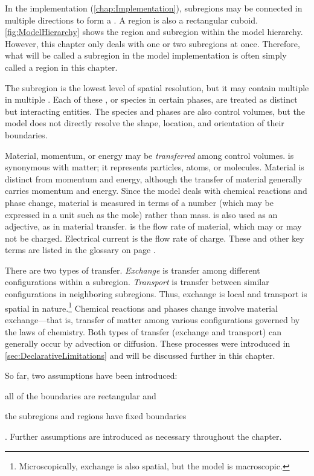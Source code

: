 In the implementation (\autoref{chap:Implementation}), subregions may be connected in multiple directions to form a \emph{}.  A region is also a rectangular cuboid.  \autoref{fig:ModelHierarchy} shows the region and subregion within the model hierarchy.  However, this chapter only deals with one or two subregions at once.  Therefore, what will be called a subregion in the model implementation is often simply called a region in this chapter.

The subregion is the lowest level of spatial resolution, but it may contain multiple \emph{} in multiple \emph{}.  Each of these \emph{}, or species in certain phases, are treated as distinct but interacting entities.  The species and phases are also control volumes, but the model does not directly resolve the shape, location, and orientation of their boundaries.

Material, momentum, or energy may be \emph{transferred} among control volumes.  \emph{} is synonymous with matter; it represents particles, atoms, or molecules.  Material is distinct from momentum and energy, although the transfer of material generally carries momentum and energy.  Since the model deals with chemical reactions and phase change, material is measured in terms of a number (which may be expressed in a unit such as the mole) rather than mass.   is also used as an adjective, as in material transfer.  \emph{} is the flow rate of material, which may or may not be charged.  Electrical current is the flow rate of charge.  These and other key terms are listed in the glossary on page \pageref{mark:Glossary}.

There are two types of transfer.  \emph{Exchange} is transfer among different configurations within a subregion.  \emph{Transport} is transfer between similar configurations in neighboring subregions.  Thus, exchange is local and transport is spatial in nature.\footnote{Microscopically, exchange is also spatial, but the model is macroscopic.}  Chemical reactions and phases change involve material exchange---that is, transfer of matter among various configurations governed by the laws of chemistry.  Both types of transfer (exchange and transport) can generally occur by advection or diffusion.  These processes were introduced in \autoref{sec:DeclarativeLimitations} and will be discussed further in this chapter.

So far, two assumptions have been introduced: \begin{inparaenum}[(1)]\item all of the boundaries are rectangular and \item the subregions and regions have fixed boundaries\end{inparaenum}.  Further assumptions are introduced as necessary throughout the chapter.


